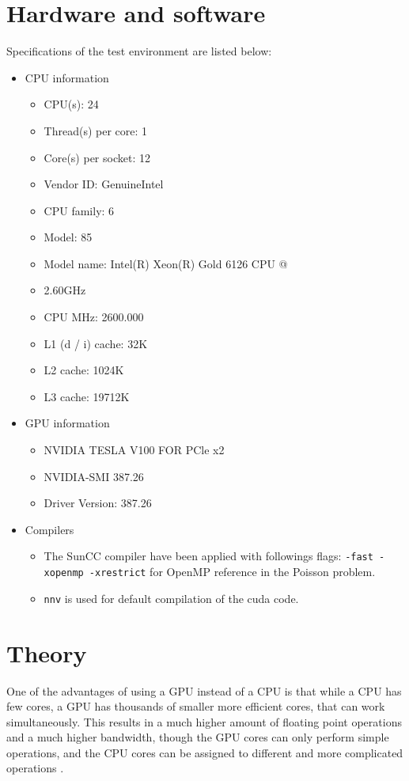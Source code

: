 \section{Hardware and software}
Specifications of the test environment are listed below:
\begin{itemize}
\item CPU information
\begin{itemize}
\item CPU(s):                24
\item Thread(s) per core:    1
\item Core(s) per socket:    12
\item Vendor ID:             GenuineIntel
\item CPU family:            6
\item Model:                 85
\item Model name:            Intel(R) Xeon(R) Gold 6126 CPU @ \item 2.60GHz
\item CPU MHz:               2600.000
\item L1 (d / i) cache:             32K
\item L2 cache:              1024K
\item L3 cache:              19712K
\end{itemize}

\item GPU information
\begin{itemize}
\item NVIDIA TESLA V100 FOR PCle x2
\item NVIDIA-SMI 387.26
\item Driver Version: 387.26
\end{itemize}
\item Compilers
\begin{itemize}
\item The SunCC compiler have been applied with followings flags: \texttt{-fast -xopenmp -xrestrict} for OpenMP reference in the Poisson problem.
\item \texttt{nnv} is used for default compilation of the cuda code.
\end{itemize}
\end{itemize}




\section{Theory}
One of the advantages of using a GPU instead of a CPU is that while a CPU has few cores, a GPU has thousands of smaller more efficient cores, that can work simultaneously. This results in a much higher amount of floating point operations and a much higher bandwidth, though the GPU cores can only perform simple operations, and the CPU cores can be assigned to different and more complicated operations \cite{C4}.\\

